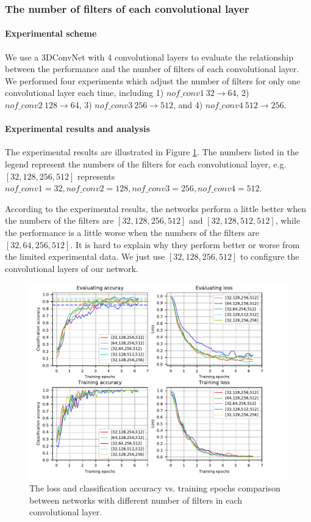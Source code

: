 \subsubsection{The number of filters of each convolutional layer}
\paragraph{Experimental scheme}
We use a 3DConvNet with 4 convolutional layers to evaluate the relationship between the performance and the number of filters of each convolutional layer. We performed four experiments which adjust the number of filters for only one convolutional layer each time, including 1) \(nof\_conv1\ 32 \rightarrow 64\), 2) \(nof\_conv2\ 128 \rightarrow 64\), 3) \(nof\_conv3\ 256 \rightarrow 512\), and 4) \(nof\_conv4\ 512 \rightarrow 256\).

\paragraph{Experimental results and analysis}
The experimental results are illustrated in Figure \ref{fig:plot_nof}. The numbers listed in the legend represent the numbers of the filters for each convolutional layer, e.g. \([32,128,256,512]\) represents \(nof\_conv1 = 32, nof\_conv2 = 128, nof\_conv3 = 256, nof\_conv4 = 512\). 
\par 
According to the experimental results, the networks perform a little better when the numbers of the filters are  \([32,128,256,512]\) and \([32,128,512,512]\), while the performance is a little worse when the numbers of the filters are \([32,64,256,512]\).
It is hard to explain why they perform better or worse from the limited experimental data. We just use  \([32,128,256,512]\) to configure the convolutional layers of our network.  
\begin{figure}
	\includegraphics[trim=0cm 0cm 0cm 0cm]{fig01/plot_nof.pdf}
	\caption{The loss and classification accuracy vs. training epochs comparison between networks with different number of filters in each convolutional layer.}
	\label{fig:plot_nof}
\end{figure}



